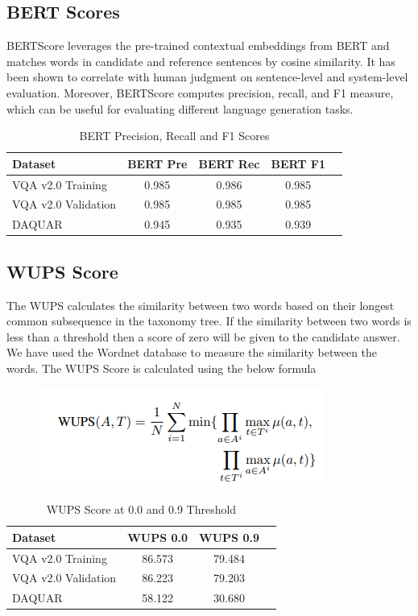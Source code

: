 \subsection{BERT Scores}
BERTScore leverages the pre-trained contextual embeddings from BERT \cite{devlin2018bert} and matches words in candidate and reference sentences by cosine similarity. It has been shown to correlate with human judgment on sentence-level and system-level evaluation. Moreover, BERTScore computes precision, recall, and F1 measure, which can be useful for evaluating different language generation tasks.
\begin{table}[h]
\centering
\begin{tabular}{@{}lcccc@{}}
\toprule
Dataset &BERT Pre&
BERT Rec&
BERT F1&\\
\midrule
VQA v2.0 Training &0.985&
0.986&
0.985\\
VQA v2.0 Validation&0.985&
0.985&
0.985\\
DAQUAR &0.945&
0.935&
0.939\\
\bottomrule
\end{tabular}
\caption{BERT Precision, Recall and F1 Scores}
\label{tab:example}
\end{table}


\subsection{WUPS Score}
The WUPS calculates the similarity between two words based on their
longest common subsequence in the taxonomy tree. If the similarity between two words is less than a threshold then a score of zero will be given to the candidate answer. We have
used the Wordnet \cite{miller1995wordnet} database to measure the similarity between the words. The WUPS Score is calculated using the below formula
\begin{figure}[htbp]
  \centering
   \includegraphics[width=0.7\linewidth]{sec/Images/image6.png}
   \label{fig:onecol}
\end{figure}

\begin{table}[h]
\centering
\begin{tabular}{@{}lccc@{}}
\toprule
Dataset & WUPS 0.0 & WUPS 0.9\\
\midrule
VQA v2.0 Training &
86.573&
79.484
\\
VQA v2.0 Validation&
86.223&
79.203
\\
DAQUAR &
58.122&
30.680&
\\
\bottomrule
\end{tabular}
\caption{WUPS Score at 0.0 and 0.9 Threshold}
\label{tab:example}
\end{table}

